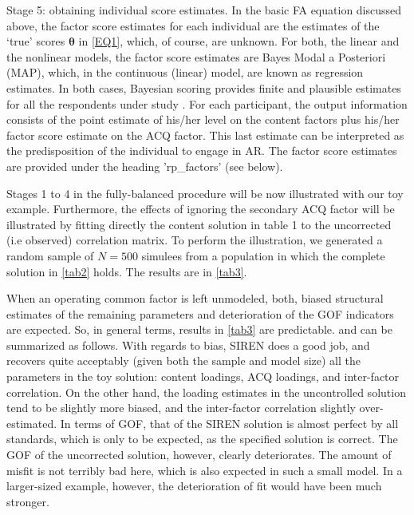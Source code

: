 Stage 5: obtaining individual score estimates. In the basic FA equation discussed above, the factor score estimates for each individual are the estimates of the ‘true’ scores $\boldsymbol{\theta}$ in \eqref{EQ1}, which, of course, are unknown.  For both, the linear and the nonlinear models, the factor score estimates are Bayes Modal a Posteriori (MAP), which, in the continuous (linear) model, are known as regression estimates. In both cases, Bayesian scoring provides finite and plausible estimates for all the respondents under study \citep[see][]{Ferrando:2016}. For each participant, the output information consists of the point estimate of his/her level on the content factors plus his/her factor score estimate on the ACQ factor. This last estimate can be interpreted as the predisposition of the individual to engage in AR. The factor score estimates are provided under the heading 'rp\_factors' (see below).

Stages 1 to 4 in the fully-balanced procedure will be now illustrated with our toy example. Furthermore, the effects of ignoring the secondary ACQ factor will be illustrated by fitting directly the content solution in table 1 to the uncorrected (i.e observed) correlation matrix. To perform the illustration, we generated a random sample of $N=500$ simulees from a population in which the complete solution in \cref{tab2} holds. The results are in \cref{tab3}.

When an operating common factor is left unmodeled, both, biased structural estimates of the remaining parameters and deterioration of the GOF indicators are expected. So, in general terms, results in \cref{tab3} are predictable. \citet{Ferrando:2010} and \citet{DeMars:2014} can be summarized as follows. With regards to bias, SIREN does a good job, and recovers quite acceptably (given both the sample and model size) all the parameters in the toy solution: content loadings, ACQ loadings, and inter-factor correlation. On the other hand, the loading estimates in the uncontrolled solution tend to be slightly more biased, and the inter-factor correlation slightly over-estimated. In terms of GOF, that of the SIREN solution is almost perfect by all standards, which is only to be expected, as the specified solution is correct. The GOF of the uncorrected solution, however, clearly deteriorates. The amount of misfit is not terribly bad here, which is also expected in such a small model. In a larger-sized example, however, the deterioration of fit would have been much stronger.

